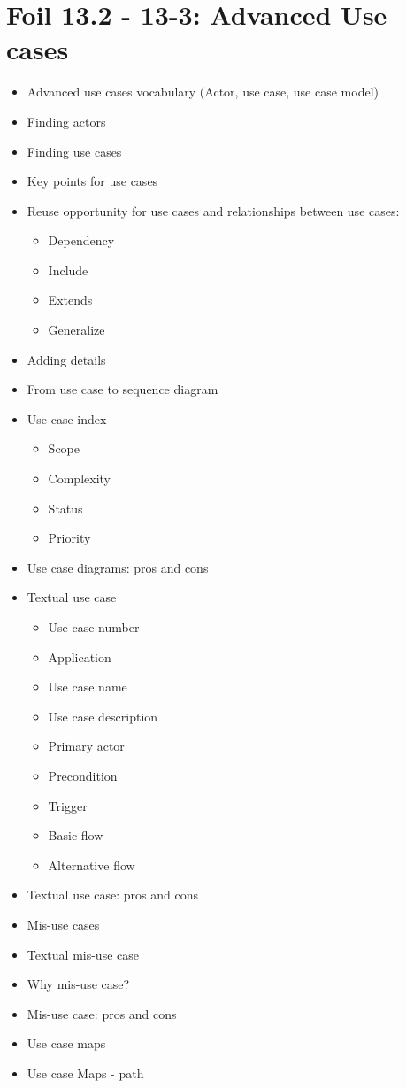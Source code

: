 	\section{Foil 13.2 - 13-3: Advanced Use cases}
		\begin{itemize}
				\item Advanced use cases vocabulary (Actor, use case, use case model)
				\item Finding actors
				\item Finding use cases
				\item Key points for use cases
				\item Reuse opportunity for use cases and relationships between use cases:
					\begin{itemize}
						\item Dependency
						\item Include
						\item Extends
						\item Generalize
					\end{itemize}
				\item Adding details
				\item From use case to sequence diagram
				\item Use case index
					\begin{itemize}
						\item Scope
						\item Complexity
						\item Status
						\item Priority
					\end{itemize}
				\item Use case diagrams: pros and cons
				\item Textual use case
					\begin{itemize}
						\item Use case number
						\item Application
						\item Use case name
						\item Use case description
						\item Primary actor
						\item Precondition
						\item Trigger
						\item Basic flow
						\item Alternative flow
					\end{itemize}
				\item Textual use case: pros and cons
				\item Mis-use cases
				\item Textual mis-use case
				\item Why mis-use case?
				\item Mis-use case: pros and cons
				\item Use case maps
				\item Use case Maps - path
		\end{itemize}


